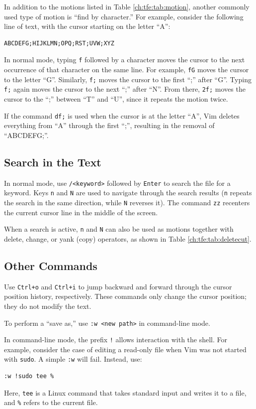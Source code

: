 In addition to the motions listed in Table \ref{ch:tfe:tab:motion}, another commonly used type of motion is ``find by character.'' For example, consider the following line of text, with the cursor starting on the letter ``A'':
\begin{lstlisting}
ABCDEFG;HIJKLMN;OPQ;RST;UVW;XYZ
\end{lstlisting}

In normal mode, typing \verb|f| followed by a character moves the cursor to the next occurrence of that character on the same line. For example, \verb|fG| moves the cursor to the letter ``G''. Similarly, \verb|f;| moves the cursor to the first ``;'' after ``G''. Typing \verb|f;| again moves the cursor to the next ``;'' after ``N''. From there, \verb|2f;| moves the cursor to the ``;'' between ``T'' and ``U'', since it repeats the motion twice.

If the command \verb|df;| is used when the cursor is at the letter ``A'', Vim deletes everything from ``A'' through the first ``;'', resulting in the removal of ``ABCDEFG;''.

\subsection{Search in the Text}

In normal mode, use \verb|/<keyword>| followed by \verb|Enter| to search the file for a keyword. Keys \verb|n| and \verb|N| are used to navigate through the search results (\verb|n| repeats the search in the same direction, while \verb|N| reverses it). The command \verb|zz| recenters the current cursor line in the middle of the screen. 

When a search is active, \verb|n| and \verb|N| can also be used as motions together with delete, change, or yank (copy) operators, as shown in Table \ref{ch:tfe:tab:deletecut}.

\subsection{Other Commands}

Use \verb|Ctrl+o| and \verb|Ctrl+i| to jump backward and forward through the cursor position history, respectively. These commands only change the cursor position; they do not modify the text.

To perform a ``save as,'' use \verb|:w <new path>| in command-line mode.

In command-line mode, the prefix \verb|!| allows interaction with the shell. For example, consider the case of editing a read-only file when Vim was not started with \verb|sudo|. A simple \verb|:w| will fail. Instead, use:
\begin{lstlisting}
:w !sudo tee %
\end{lstlisting}
Here, \verb|tee| is a Linux command that takes standard input and writes it to a file, and \verb|%| refers to the current file.

